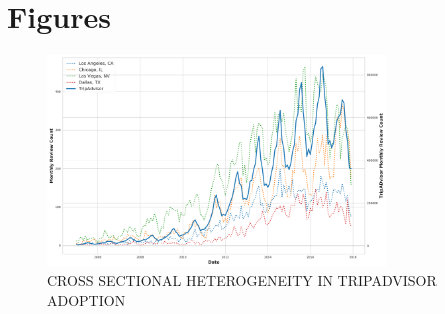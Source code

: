 \documentclass[12pt, leqno]{article}
\begin{document}
\section*{Figures} \label{sec:fig}

 
 

 


\begin{figure}[hp]
\caption{CROSS SECTIONAL HETEROGENEITY IN TRIPADVISOR ADOPTION}
 \label{fig:taadopt}
 \centering
 \includegraphics[width=0.8\textwidth,height=\textheight,keepaspectratio]{./Figures/TA_Adoption.png}
\end{figure}
\clearpage
\end{document}
